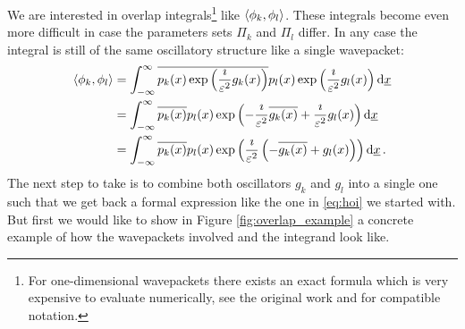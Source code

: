 \documentclass[a4paper,10pt]{article}
\begin{document}
We are interested in overlap integrals\footnote{For one-dimensional wavepackets there
exists an exact formula which is very expensive to evaluate numerically, see the original work
\cite{H_R_quantization_rules} and \cite{B_bachelor_thesis} for compatible notation.} like
$\left\langle \phi_k , \phi_l \right\rangle$. These integrals become even more difficult in case the parameters
sets $\Pi_k$ and $\Pi_l$ differ. In any case the integral is still of the same oscillatory
structure like a single wavepacket:
\begin{equation}
\begin{split}
  \left\langle \phi_k , \phi_l \right\rangle & =
  \int_{-\infty}^{\infty} \overline{p_k(x)\exp\left(\frac{\imath}{\varepsilon^2} g_k(x)\right)}
                                p_l(x)\exp\left(\frac{\imath}{\varepsilon^2} g_l(x)\right)
  \mathrm{d}\underline{x} \\
  & =
  \int_{-\infty}^{\infty}
    \overline{p_k(x)} p_l(x)
    \exp\left(-\frac{\imath}{\varepsilon^2} \overline{g_k(x)} + \frac{\imath}{\varepsilon^2} g_l(x)\right)
  \mathrm{d}\underline{x} \\
  & =
  \int_{-\infty}^{\infty}
    \overline{p_k(x)} p_l(x)
    \exp\left(\frac{\imath}{\varepsilon^2}\left(-\overline{g_k(x)} + g_l(x)\right)\right)
  \mathrm{d}\underline{x} \,.
\end{split}
\end{equation}
The next step to take is to combine both oscillators $g_k$ and $g_l$ into a
single one such that we get back a formal expression like the one in
\eqref{eq:hoi} we started with. But first we would like to
show in Figure \ref{fig:overlap_example} a concrete example of how the
wavepackets involved and the integrand look like.
\end{document}
